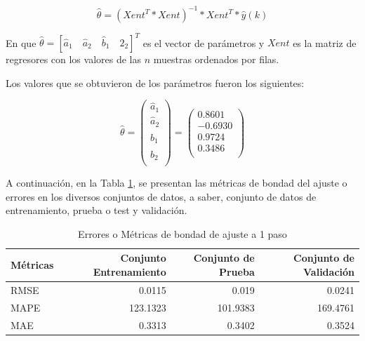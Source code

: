 \documentclass[12pt]{article}
\begin{document}
\begin{equation}
\hat{\theta}=(Xent^T*Xent)^{-1}*Xent^T*\hat{y}(k)
\label{e_AjustMinCuadrados}
\end{equation}


En que $\hat{\theta}=[\hat{a}_1 \quad \hat{a}_2 \quad \hat{b}_1 \quad \hat{2}_2]^T$ es el vector de parámetros y $Xent$ es la matriz de regresores con los valores de las $n$ muestras ordenados por filas.

Los valores que se obtuvieron de los parámetros fueron los siguientes:


\begin{equation}
\hat{\theta}=\left(
                \begin{array}{c}
                  \hat{a}_1  \\
                  \hat{a}_2  \\
                  \hat{b}_1  \\
                  \hat{b}_2  \\
                \end{array}
              \right)
=\left(
   \begin{array}{c}
     0.8601 \\
     -0.6930 \\
     0.9724 \\
     0.3486 \\
   \end{array}
 \right)
\label{e_ValoresCoeficientes}
\end{equation}

A continuación, en la Tabla \ref{t_NoLinealp1}, se presentan las métricas de bondad del ajuste o errores en los diversos conjuntos de datos, a saber, conjunto de datos de entrenamiento, prueba o test y validación.


\begin{table}[htbp]
  \centering
  \caption{Errores o Métricas de bondad de ajuste a 1 paso}
    \begin{tabular}{|p{4.055em}|r|r|r|}
    \toprule
    Métricas & \multicolumn{1}{p{6.11em}|}{Conjunto Entrenamiento} & \multicolumn{1}{p{5.61em}|}{Conjunto de Prueba} & \multicolumn{1}{p{5.055em}|}{Conjunto de Validación} \\
    \midrule
    RMSE  & 0.0115 & 0.019 & 0.0241 \\
    \midrule
    MAPE  & 123.1323 & 101.9383 & 169.4761 \\
    \midrule
    MAE   & 0.3313 & 0.3402 & 0.3524 \\
    \bottomrule
    \end{tabular}%
  \label{t_NoLinealp1}%
\end{table}%
\end{document}
